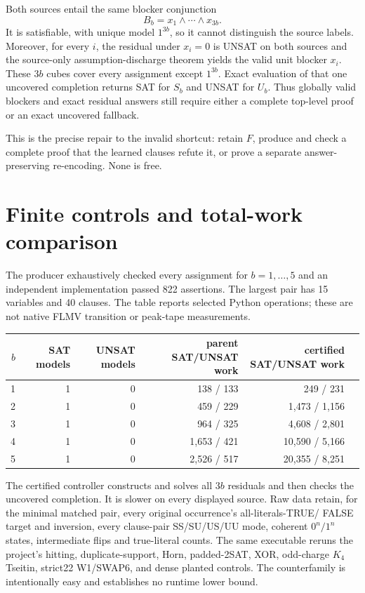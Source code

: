 \documentclass[11pt]{article}
\begin{document}
Both sources entail the same blocker conjunction
\[
 B_b=x_1\wedge\cdots\wedge x_{3b}.
\]
It is satisfiable, with unique model $1^{3b}$, so it cannot distinguish the
source labels.  Moreover, for every $i$, the residual under $x_i=0$ is UNSAT
on both sources and the source-only assumption-discharge theorem yields the
valid unit blocker $x_i$.  These $3b$ cubes cover every assignment except
$1^{3b}$.  Exact evaluation of that one uncovered completion returns SAT for
$S_b$ and UNSAT for $U_b$.  Thus globally valid blockers and exact residual
answers still require either a complete top-level proof or an exact uncovered
fallback.

This is the precise repair to the invalid shortcut: retain $F$, produce and
check a complete proof that the learned clauses refute it, or prove a separate
answer-preserving re-encoding.  None is free.

\section{Finite controls and total-work comparison}
The producer exhaustively checked every assignment for $b=1,\ldots,5$ and an
independent implementation passed 822 assertions.  The largest pair has 15
variables and 40 clauses.  The table reports selected Python operations; these
are not native FLMV transition or peak-tape measurements.

\begin{center}
\begin{tabular}{rrrrrr}
\toprule
$b$ & SAT models & UNSAT models & parent SAT/UNSAT work & certified SAT/UNSAT work\\
\midrule
1&1&0&138 / 133&249 / 231\\
2&1&0&459 / 229&1,473 / 1,156\\
3&1&0&964 / 325&4,608 / 2,801\\
4&1&0&1,653 / 421&10,590 / 5,166\\
5&1&0&2,526 / 517&20,355 / 8,251\\
\bottomrule
\end{tabular}
\end{center}

The certified controller constructs and solves all $3b$ residuals and then
checks the uncovered completion.  It is slower on every displayed source.
Raw data retain, for the minimal matched pair, every original occurrence's
all-literals-TRUE/ FALSE target and inversion, every clause-pair SS/SU/US/UU
mode, coherent $0^n/1^n$ states, intermediate flips and true-literal counts.
The same executable reruns the project's hitting, duplicate-support, Horn,
padded-2SAT, XOR, odd-charge $K_4$ Tseitin, strict22 W1/SWAP6, and dense planted
controls.  The counterfamily is intentionally easy and establishes no runtime
lower bound.
\end{document}
